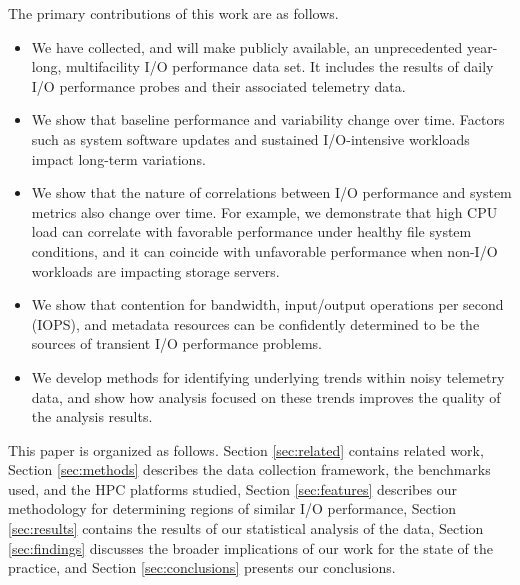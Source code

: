

The primary contributions of this work are as follows. 
\begin{itemize}[leftmargin=*]
\item We have collected, and will make publicly available, an unprecedented year-long, multifacility
I/O performance data set. It includes the results of daily I/O performance
probes and their associated telemetry data.
\item We show that baseline performance and variability change over time.
Factors such as system software updates and sustained I/O-intensive workloads impact long-term variations.
\item We show that the nature of correlations between I/O performance and system metrics also change over
time. For example, we demonstrate that high CPU load can correlate with favorable performance under healthy file system conditions, and it can coincide with unfavorable performance when non-I/O workloads are impacting storage servers.
\item We show that contention for bandwidth, input/output operations per second (IOPS), and metadata resources can be confidently determined to be the sources of transient I/O performance problems.
\item We develop methods for identifying
underlying trends within noisy telemetry data, and show how analysis focused
on these trends improves the quality of the analysis results.
\end{itemize}


This paper is organized as follows. Section \ref{sec:related} contains related work, Section \ref{sec:methods} describes the data collection framework, the benchmarks used, and the HPC platforms studied, Section \ref{sec:features} describes our methodology for determining regions of similar I/O performance, Section \ref{sec:results} contains the results of our statistical analysis of the data, Section \ref{sec:findings}  discusses the broader implications of our work for the state of the practice, and Section \ref{sec:conclusions} presents our conclusions. 

